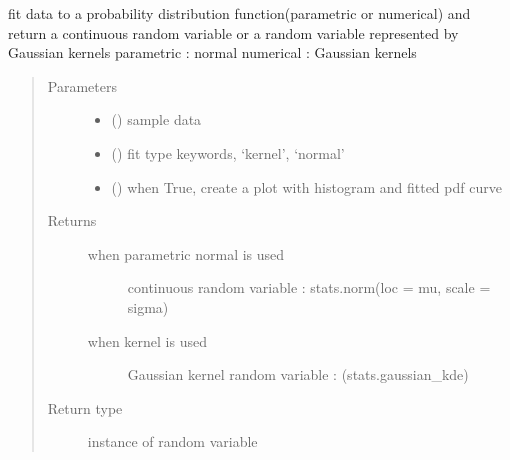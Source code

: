 \documentclass[letterpaper,10pt,english]{sphinxmanual}
\begin{document}
\begin{fulllineitems}
\label{\detokenize{helper_func:helper_func.Fit_distrib}}
\sphinxAtStartPar
fit data to a probability distribution function(parametric or numerical)
and return a continuous random variable or a random variable represented by Gaussian kernels
parametric : normal
numerical : Gaussian kernels
\begin{quote}\begin{description}
\item[{Parameters}] \leavevmode\begin{itemize}
\item {} 
\sphinxAtStartPar
{} () \textendash{} sample data

\item {} 
\sphinxAtStartPar
{} () \textendash{} fit type keywords, ‘kernel’, ‘normal’

\item {} 
\sphinxAtStartPar
{} () \textendash{} when True, create a plot with histogram and fitted pdf curve

\end{itemize}

\item[{Returns}] \leavevmode
\sphinxAtStartPar
\begin{description}
\item[{when parametric normal is used}] \leavevmode
\sphinxAtStartPar
continuous random variable : stats.norm(loc = mu, scale = sigma)

\item[{when kernel is used}] \leavevmode
\sphinxAtStartPar
Gaussian kernel random variable : (stats.gaussian\_kde)

\end{description}


\item[{Return type}] \leavevmode
\sphinxAtStartPar
instance of random variable

\end{description}\end{quote}

\end{fulllineitems}
\end{document}
